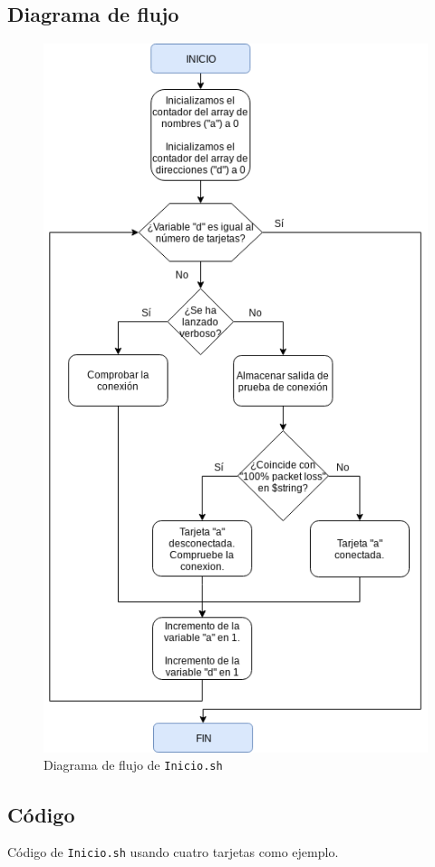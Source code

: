 \subsection{Diagrama de flujo}
\begin{figure}[h]
	\centering
	\includegraphics[scale=0.562]{Anexos/Anexo2/Test/Inicio.png}
	\caption{Diagrama de flujo de \texttt{Inicio.sh}}
	\label{Diagrama de flujo de Inicio.sh}
\end{figure}

\newpage
\subsection{Código}

\begin{center}
	Código de \texttt{Inicio.sh} usando cuatro tarjetas como ejemplo.
\end{center}


